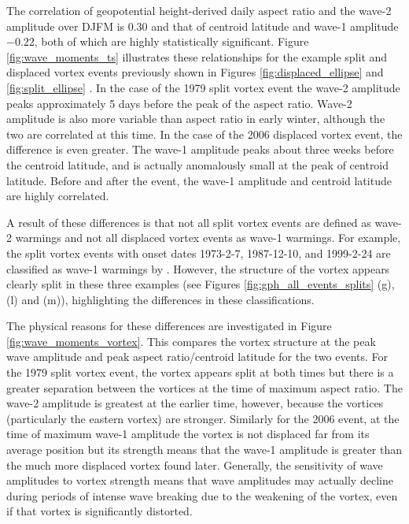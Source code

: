 The correlation of geopotential height-derived daily aspect ratio and the wave-2
amplitude over DJFM is 0.30 and that of centroid latitude and wave-1 amplitude
$-0.22$, both of which are highly statistically significant. Figure
\ref{fig:wave_moments_ts} illustrates these relationships for the example split
and displaced vortex events previously shown in Figures
\ref{fig:displaced_ellipse} and \ref{fig:split_ellipse} . In the case of the
1979 split vortex event the wave-2 amplitude peaks approximately 5 days before
the peak of the aspect ratio. Wave-2 amplitude is also more variable than aspect
ratio in early winter, although the two are correlated at this time. In the case
of the 2006 displaced vortex event, the difference is even greater. The wave-1
amplitude peaks about three weeks before the centroid latitude, and is actually
anomalously small at the peak of centroid latitude. Before and after the event,
the wave-1 amplitude and centroid latitude are highly correlated.

A result of these differences is that not all split vortex events are defined as
wave-2 warmings and not all displaced vortex events as wave-1 warmings. For
example, the split vortex events with onset dates 1973-2-7, 1987-12-10, and
1999-2-24 are classified as wave-1 warmings by \citet{Bancala2012}. However, the
structure of the vortex appears clearly split in these three examples (see
Figures \ref{fig:gph_all_events_splits} (g), (l) and (m)), highlighting the
differences in these classifications.

The physical reasons for these differences are investigated in Figure
\ref{fig:wave_moments_vortex}. This compares the vortex structure at the peak
wave amplitude and peak aspect ratio/centroid latitude for the two events. For
the 1979 split vortex event, the vortex appears split at both times but there is
a greater separation between the vortices at the time of maximum aspect
ratio. The wave-2 amplitude is greatest at the earlier time, however, because
the vortices (particularly the eastern vortex) are stronger. Similarly for the
2006 event, at the time of maximum wave-1 amplitude the vortex is not displaced
far from its average position but its strength means that the wave-1 amplitude
is greater than the much more displaced vortex found later. Generally, the
sensitivity of wave amplitudes to vortex strength means that wave amplitudes may
actually decline during periods of intense wave breaking due to the weakening of
the vortex, even if that vortex is significantly distorted.

